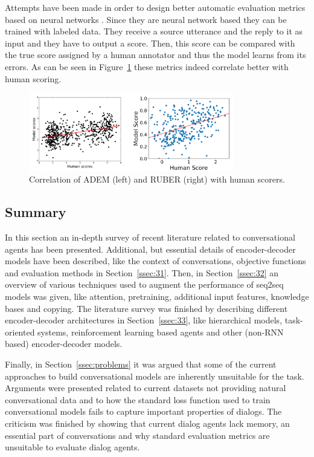 \documentclass[12pt]{article}
\begin{document}
Attempts have been made in order to design better automatic evaluation metrics based on neural networks \cite{Tao:2017,Lowe:2017,Li_adversarial:2017}. Since they are neural network based they can be trained with labeled data. They receive a source utterance and the reply to it as input and they have to output a score. Then, this score can be compared with the true score assigned by a human annotator and thus the model learns from its errors. As can be seen in Figure~\ref{fig:adem_ruber} these metrics indeed correlate better with human scoring.
\begin{figure}[H]
	\centering
	\includegraphics[width=0.8\textwidth]{pics/adem_ruber.png}
	\caption{Correlation of ADEM (left) \cite{Lowe:2017} and RUBER (right) \cite{Tao:2017} with human scorers.}
	\label{fig:adem_ruber}
\end{figure}

\subsection{Summary} \label{ssec:summary}
In this section an in-depth survey of recent literature related to conversational agents has been presented. Additional, but essential details of encoder-decoder models have been described, like the context of conversations, objective functions and evaluation methods in Section~\ref{ssec:31}. Then, in Section~\ref{ssec:32} an overview of various techniques used to augment the performance of seq2seq models was given, like attention, pretraining, additional input features, knowledge bases and copying. The literature survey was finished by describing different encoder-decoder architectures in Section~\ref{ssec:33}, like hierarchical models, task-oriented systems, reinforcement learning based agents and other (non-RNN based) encoder-decoder models.

Finally, in Section~\ref{ssec:problems} it was argued that some of the current approaches to build conversational models are inherently unsuitable for the task. Arguments were presented related to current datasets not providing natural conversational data and to how the standard loss function used to train conversational models fails to capture important properties of dialogs. The criticism was finished by showing that current dialog agents lack memory, an essential part of conversations and why standard evaluation metrics are unsuitable to evaluate dialog agents.
    
\end{document}
